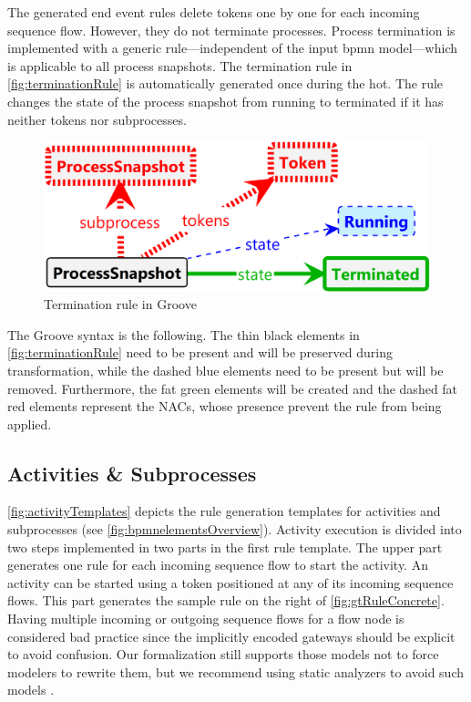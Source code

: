 \documentclass[runningheads]{lmcs}
\begin{document}
The generated end event rules delete tokens one by one for each incoming sequence flow.
However, they do not terminate processes.
Process termination is implemented with a generic rule---independent of the input \gls*{bpmn} model---which is applicable to all process snapshots.
The termination rule in \autoref{fig:terminationRule} is automatically generated once during the \gls*{hot}.
The rule changes the state of the process snapshot from running to terminated if it has neither tokens nor subprocesses.

\begin{figure}[ht]
    \centering
    \includegraphics[width=.6\textwidth]{images/terminate_groove.png}
    \caption{Termination rule in Groove}
    \label{fig:terminationRule}
\end{figure}

The Groove syntax is the following.
The thin black elements in \autoref{fig:terminationRule} need to be present and will be preserved during transformation, while the dashed blue elements need to be present but will be removed.
Furthermore, the fat green elements will be created and the dashed fat red elements represent the NACs, whose presence prevent the rule from being applied.

\subsection{Activities \& Subprocesses}

\autoref{fig:activityTemplates} depicts the rule generation templates for activities and subprocesses (see \autoref{fig:bpmnelementsOverview}).
Activity execution is divided into two steps implemented in two parts in the first rule template.
The upper part generates one rule for each incoming sequence flow to start the activity.
An activity can be started using a token positioned at any of its incoming sequence flows.
This part generates the sample rule on the right of \autoref{fig:gtRuleConcrete}.
Having multiple incoming or outgoing sequence flows for a flow node is considered bad practice since the implicitly encoded gateways should be explicit to avoid confusion.
Our formalization still supports those models not to force modelers to rewrite them, but we recommend using static analyzers to avoid such models \cite{camundaservicesgmbhBpmnlint2023}.
\end{document}
